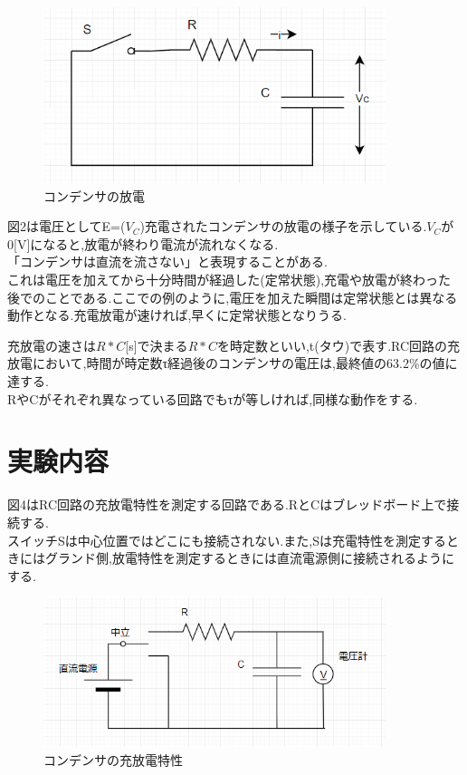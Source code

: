 \documentclass[titlepage]{jarticle}
\begin{document}
\begin{figure}[H]
    \begin{center}
        \includegraphics[width=10cm]{image/2.png}
        \caption{コンデンサの放電}
    \end{center}
\end{figure}
図2は電圧としてE=($V_C$)充電されたコンデンサの放電の様子を示している.$V_C$が0[V]になると,放電が終わり電流が流れなくなる.\\

「コンデンサは直流を流さない」と表現することがある.\\
これは電圧を加えてから十分時間が経過した(定常状態),充電や放電が終わった後でのことである.ここでの例のように,電圧を加えた瞬間は定常状態とは異なる動作となる.充電放電が速ければ,早くに定常状態となりうる.

充放電の速さは$R * C$[s]で決まる$R * C$を時定数といい,t(タウ)で表す.RC回路の充放電において,時間が時定数τ経過後のコンデンサの電圧は,最終値の63.2\%の値に達する.\\
RやCがそれぞれ異なっている回路でもτが等しければ,同様な動作をする.

\section{実験内容}
図4はRC回路の充放電特性を測定する回路である.RとCはブレッドボード上で接続する.\\
スイッチSは中心位置ではどこにも接続されない.また,Sは充電特性を測定するときにはグランド側,放電特性を測定するときには直流電源側に接続されるようにする.
\begin{figure}[H]
    \begin{center}
        \includegraphics[width=10cm]{image/3.png}
        \caption{コンデンサの充放電特性}
    \end{center}
\end{figure}
\end{document}
